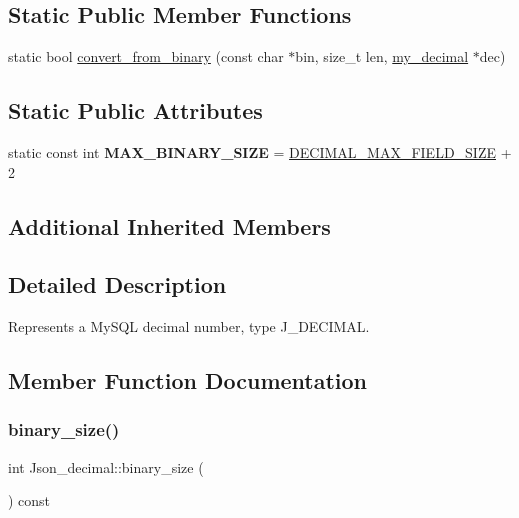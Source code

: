 \subsection*{Static Public Member Functions}
\begin{DoxyCompactItemize}
\item 
static bool \mbox{\hyperlink{classJson__decimal_ac9b373f1acb0c29a32caf136d1f9e31a}{convert\+\_\+from\+\_\+binary}} (const char $\ast$bin, size\+\_\+t len, \mbox{\hyperlink{classmy__decimal}{my\+\_\+decimal}} $\ast$dec)
\end{DoxyCompactItemize}
\subsection*{Static Public Attributes}
\begin{DoxyCompactItemize}
\item 
\mbox{\label{classJson__decimal_a6e857732dc22dde57ddaeaae01e5dcf2}} 
static const int {\bfseries M\+A\+X\+\_\+\+B\+I\+N\+A\+R\+Y\+\_\+\+S\+I\+ZE} = \mbox{\hyperlink{my__decimal_8h_a5a34aae7126c775b3d1302db2732f202}{D\+E\+C\+I\+M\+A\+L\+\_\+\+M\+A\+X\+\_\+\+F\+I\+E\+L\+D\+\_\+\+S\+I\+ZE}} + 2
\end{DoxyCompactItemize}
\subsection*{Additional Inherited Members}


\subsection{Detailed Description}
Represents a My\+S\+QL decimal number, type J\+\_\+\+D\+E\+C\+I\+M\+AL. 

\subsection{Member Function Documentation}
\mbox{\label{classJson__decimal_ae65238ee764087fe5b03a9bf86131ea1}} 
\subsubsection{\texorpdfstring{binary\+\_\+size()}{binary\_size()}}
{\footnotesize\ttfamily int Json\+\_\+decimal\+::binary\+\_\+size (\begin{DoxyParamCaption}{ }\end{DoxyParamCaption}) const}

